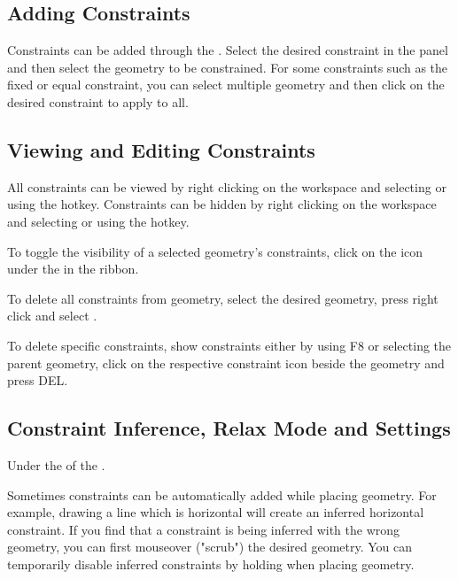 \subsection{Adding Constraints}
Constraints can be added through the . Select the desired constraint in the panel and then select the geometry to be constrained. For some constraints such as the fixed or equal constraint, you can select multiple geometry and then click on the desired constraint to apply to all.
\subsection{Viewing and Editing Constraints}
All constraints can be viewed by right clicking on the workspace and selecting \newline {} or using the  hotkey. Constraints can be hidden by right clicking on the workspace and selecting  or using the  hotkey.

To toggle the visibility of a selected geometry's constraints, click on the  icon under the  in the ribbon.

To delete all constraints from geometry, select the desired geometry, press right click and select .

To delete specific constraints, show constraints either by using F8 or selecting the parent geometry, click on the respective constraint icon beside the geometry and press DEL.
\subsection{Constraint Inference, Relax Mode and Settings}

\begin{where-to-find}
Under the  of the .
\end{where-to-find}

\harddifficulty

Sometimes constraints can be automatically added while placing geometry. For example, drawing a line which is horizontal will create an inferred horizontal constraint. If you find that a constraint is being inferred with the wrong geometry, you can first mouseover ("scrub") the desired geometry. You can temporarily disable inferred constraints by holding  when placing geometry.

